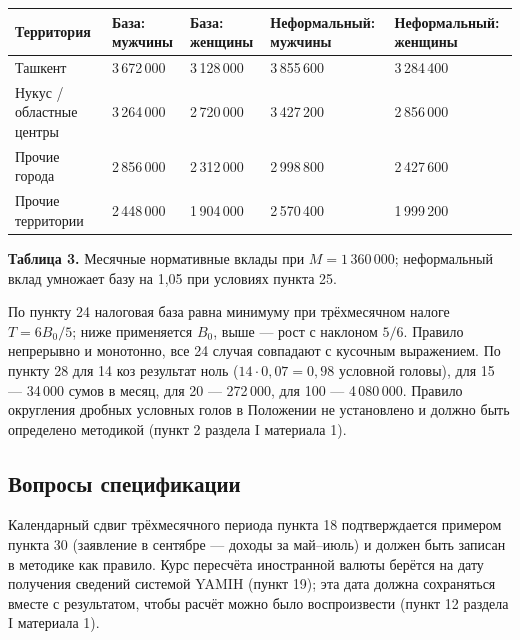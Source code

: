 \documentclass[12pt,a4paper]{extarticle}
\begin{document}
\begingroup\fontsize{11bp}{13.2bp}\selectfont
\begin{longtable}{p{} p{} p{} p{} p{}}
\toprule
Территория & База: мужчины & База: женщины & Неформальный: мужчины & Неформальный: женщины \\
\midrule
\endhead
Ташкент & 3\,672\,000 & 3\,128\,000 & 3\,855\,600 & 3\,284\,400 \\
Нукус / областные центры & 3\,264\,000 & 2\,720\,000 & 3\,427\,200 & 2\,856\,000 \\
Прочие города & 2\,856\,000 & 2\,312\,000 & 2\,998\,800 & 2\,427\,600 \\
Прочие территории & 2\,448\,000 & 1\,904\,000 & 2\,570\,400 & 1\,999\,200 \\
\bottomrule
\end{longtable}
\endgroup
\textbf{Таблица 3.} Месячные нормативные вклады при $M=1\,360\,000$; неформальный вклад умножает базу на 1,05 при условиях пункта 25.

По пункту 24 налоговая база равна минимуму при трёхмесячном налоге $T=6B_0/5$; ниже применяется $B_0$, выше — рост с наклоном $5/6$. Правило непрерывно и монотонно, все 24 случая совпадают с кусочным выражением. По пункту 28 для 14 коз результат ноль ($14\cdot0{,}07=0{,}98$ условной головы), для 15 — 34\,000 сумов в месяц, для 20 — 272\,000, для 100 — 4\,080\,000. Правило округления дробных условных голов в Положении не установлено и должно быть определено методикой (пункт 2 раздела I материала 1).

\subsection{Вопросы спецификации}
Календарный сдвиг трёхмесячного периода пункта 18 подтверждается примером пункта 30 (заявление в сентябре — доходы за май–июль) и должен быть записан в методике как правило. Курс пересчёта иностранной валюты берётся на дату получения сведений системой YAMIH (пункт 19); эта дата должна сохраняться вместе с результатом, чтобы расчёт можно было воспроизвести (пункт 12 раздела I материала 1).
\end{document}
